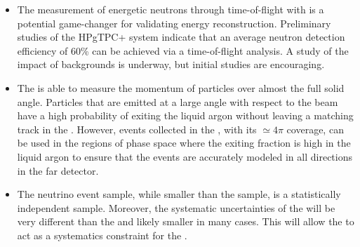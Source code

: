 \begin{itemize}
    \item The measurement of energetic neutrons through time-of-flight with  is a potential game-changer for validating energy reconstruction. Preliminary studies of the HPgTPC+ system indicate that an average neutron detection efficiency of 60\% can be achieved via a time-of-flight analysis. A study of the impact of backgrounds is underway, but initial studies are encouraging.

    \item{The  is able to measure the momentum of particles over almost the full solid angle.  Particles that are emitted at a large angle with respect to the beam have a high probability of exiting the liquid argon without leaving a matching track in the . However, events collected in the , with its $\simeq 4\pi$ coverage, can be used in the regions of phase space where the exiting fraction is high in the liquid argon to ensure that the events are accurately modeled in all directions in the far detector. }
    
    \item{The  neutrino event sample, while smaller than the  sample, is a statistically independent sample. Moreover, the systematic uncertainties of the  will be very different than the  and likely smaller in many cases. This will allow the  to act as a systematics constraint for the .
    }
\end{itemize}

